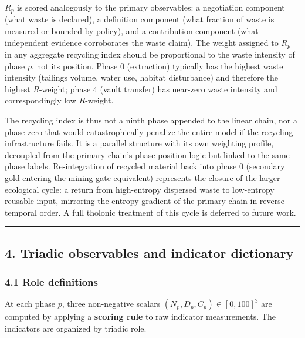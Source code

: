 \documentclass[
  11pt,
  letterpaper,
]{article}
\begin{document}
\(R_p\) is scored analogously to the primary observables: a negotiation
component (what waste is declared), a definition component (what
fraction of waste is measured or bounded by policy), and a contribution
component (what independent evidence corroborates the waste claim). The
weight assigned to \(R_p\) in any aggregate recycling index should be
proportional to the waste intensity of phase \(p\), not its position.
Phase 0 (extraction) typically has the highest waste intensity (tailings
volume, water use, habitat disturbance) and therefore the highest
\(R\)-weight; phase 4 (vault transfer) has near-zero waste intensity and
correspondingly low \(R\)-weight.

The recycling index is thus not a ninth phase appended to the linear
chain, nor a phase zero that would catastrophically penalize the entire
model if the recycling infrastructure fails. It is a parallel structure
with its own weighting profile, decoupled from the primary chain's
phase-position logic but linked to the same phase labels. Re-integration
of recycled material back into phase 0 (secondary gold entering the
mining-gate equivalent) represents the closure of the larger ecological
cycle: a return from high-entropy dispersed waste to low-entropy
reusable input, mirroring the entropy gradient of the primary chain in
reverse temporal order. A full tholonic treatment of this cycle is
deferred to future work.

\begin{center}\rule{0.5\linewidth}{0.5pt}\end{center}

\subsection{4. Triadic observables and indicator
dictionary}\label{triadic-observables-and-indicator-dictionary}

\subsubsection{4.1 Role definitions}\label{role-definitions}

At each phase \(p\), three non-negative scalars
\((N_p, D_p, C_p) \in [0,100]^3\) are computed by applying a
\textbf{scoring rule} to raw indicator measurements. The indicators are
organized by triadic role.
\end{document}
